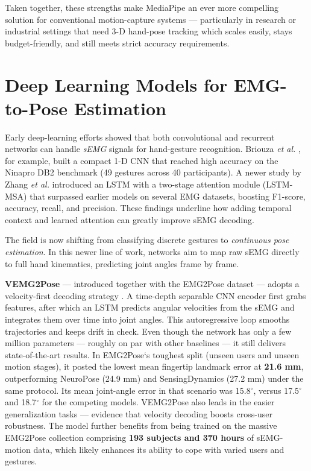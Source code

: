 Taken together, these strengths make MediaPipe an ever more compelling solution for conventional motion-capture systems — particularly in research or industrial settings that need 3-D hand-pose tracking which scales easily, stays budget-friendly, and still meets strict accuracy requirements.

\section{Deep Learning Models for EMG-to-Pose Estimation}

Early deep-learning efforts showed that both convolutional and recurrent networks can handle \textit{sEMG} signals for hand-gesture recognition. Briouza \textit{et al.} \cite{briouza2021convolutional}, for example, built a compact 1-D CNN that reached high accuracy on the Ninapro DB2 benchmark (49 gestures across 40 participants). A newer study by Zhang \textit{et al.} \cite{zhang2023lstm} introduced an LSTM with a two-stage attention module (LSTM-MSA) that surpassed earlier models on several EMG datasets, boosting F1-score, accuracy, recall, and precision. These findings underline how adding temporal context and learned attention can greatly improve sEMG decoding.

The field is now shifting from classifying discrete gestures to \textit{continuous pose estimation}. In this newer line of work, networks aim to map raw sEMG directly to full hand kinematics, predicting joint angles frame by frame.

\textbf{VEMG2Pose} — introduced together with the EMG2Pose dataset — adopts a velocity-first decoding strategy \cite{salter2024emg2pose}. A time-depth separable CNN encoder first grabs features, after which an LSTM predicts angular velocities from the sEMG and integrates them over time into joint angles. This autoregressive loop smooths trajectories and keeps drift in check. Even though the network has only a few million parameters — roughly on par with other baselines — it still delivers state-of-the-art results. In EMG2Pose`s toughest split (unseen users and unseen motion stages), it posted the lowest mean fingertip landmark error at \textbf{21.6  mm}, outperforming NeuroPose (24.9  mm) and SensingDynamics (27.2  mm) under the same protocol. Its mean joint-angle error in that scenario was 15.8$^\circ$, versus 17.5$^\circ$ and 18.7$^\circ$ for the competing models. VEMG2Pose also leads in the easier generalization tasks — evidence that velocity decoding boosts cross-user robustness. The model further benefits from being trained on the massive EMG2Pose collection comprising \textbf{193 subjects and 370 hours} of sEMG-motion data, which likely enhances its ability to cope with varied users and gestures.

